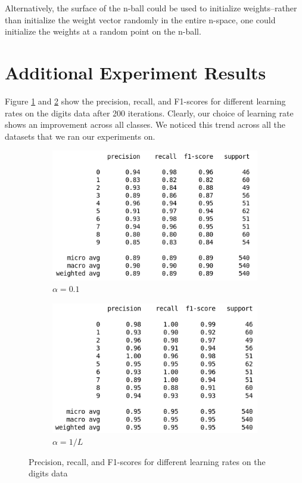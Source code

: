 \documentclass[sigconf,authordraft]{acmart}
\begin{document}
Alternatively, the surface of the n-ball could be used to initialize weights--rather than initialize the weight vector randomly in the entire n-space, one could initialize the weights at a random point on the n-ball.




\appendix

\section{Additional Experiment Results}
Figure \ref{fig:1:a} and \ref{fig:1:b} show the precision, recall, and F1-scores for different learning rates on the digits data after 200 iterations. Clearly, our choice of learning rate shows an improvement across all classes. We noticed this trend across all the datasets that we ran our experiments on.

\begin{figure}
    \begin{subfigure}{.5\textwidth}
        \centering
        \includegraphics[scale=0.6]{lr_01_report.png}
        \caption{$\alpha=0.1$}
        \label{fig:1:a}
    \end{subfigure}
    \begin{subfigure}{.5\textwidth}
        \centering
        \includegraphics[scale=0.6]{lr_inv_report.png}
        \caption{$\alpha=1/L$}
        \label{fig:1:b}
    \end{subfigure}
    
    \caption{Precision, recall, and F1-scores for different learning rates on the digits data}
    \label{fig:1}
\end{figure}
\end{document}
